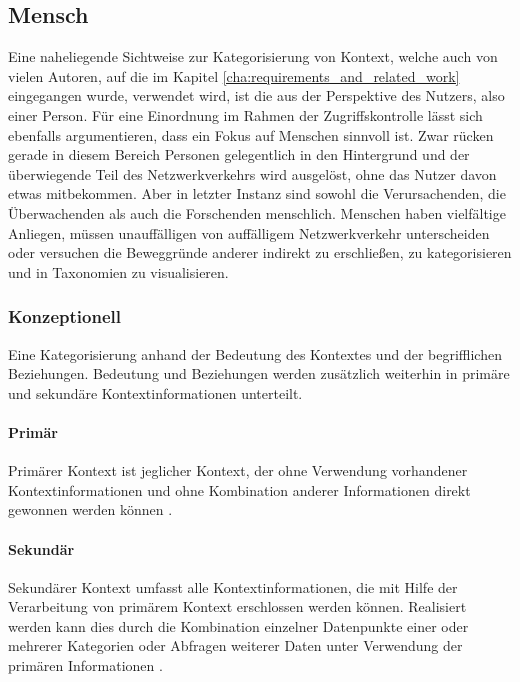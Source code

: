 \subsection{Mensch}
Eine naheliegende Sichtweise zur Kategorisierung von Kontext, welche auch von vielen Autoren, auf die im Kapitel \ref{cha:requirements_and_related_work} eingegangen wurde, verwendet wird, ist die aus der Perspektive des Nutzers, also einer Person. Für eine Einordnung im Rahmen der Zugriffskontrolle lässt sich ebenfalls argumentieren, dass ein Fokus auf Menschen sinnvoll ist. Zwar rücken gerade in diesem Bereich Personen gelegentlich in den Hintergrund und der überwiegende Teil des Netzwerkverkehrs wird ausgelöst, ohne das Nutzer davon etwas mitbekommen. Aber in letzter Instanz sind sowohl die Verursachenden, die Überwachenden als auch die Forschenden menschlich. Menschen haben vielfältige Anliegen, müssen unauffälligen von auffälligem Netzwerkverkehr unterscheiden oder versuchen die Beweggründe anderer indirekt zu erschließen, zu kategorisieren und in Taxonomien zu visualisieren.

\subsubsection{Konzeptionell}
Eine Kategorisierung anhand der Bedeutung des Kontextes und der begrifflichen Beziehungen. Bedeutung und Beziehungen werden zusätzlich weiterhin in primäre und sekundäre Kontextinformationen unterteilt.
\paragraph{Primär}
Primärer Kontext ist jeglicher Kontext, der ohne Verwendung vorhandener Kontextinformationen und ohne Kombination anderer Informationen direkt gewonnen werden können \cite{abowd_towards_1999}. 
\paragraph{Sekundär}
Sekundärer Kontext umfasst alle Kontextinformationen, die mit Hilfe der Verarbeitung von primärem Kontext erschlossen werden können. Realisiert werden kann dies durch die Kombination einzelner Datenpunkte einer oder mehrerer Kategorien oder Abfragen weiterer Daten unter Verwendung der primären Informationen  \cite{abowd_towards_1999}.
